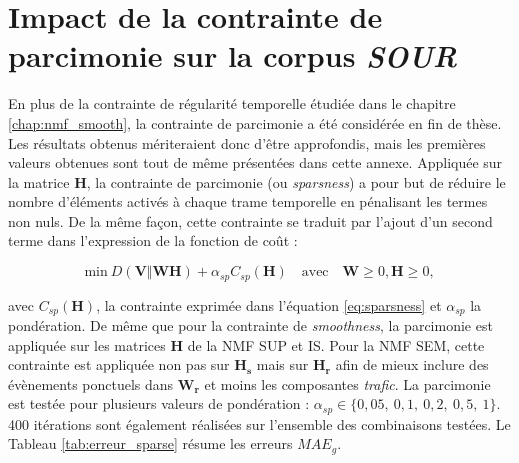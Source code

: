 \chapter{Impact de la contrainte de parcimonie sur la corpus \textit{SOUR}}\label{annexe:parcimonie}

En plus de la contrainte de régularité temporelle étudiée dans le chapitre \ref{chap:nmf_smooth}, la contrainte de parcimonie a été considérée en fin de thèse. Les résultats obtenus mériteraient donc d'être approfondis, mais les premières valeurs obtenues sont tout de même présentées dans cette annexe. Appliquée sur la matrice $\mathbf{H}$, la contrainte de parcimonie (ou \textit{sparsness}) a pour but de réduire le nombre d'éléments activés à chaque trame temporelle en pénalisant les termes non nuls. De la même façon, cette contrainte se traduit par l'ajout d'un second terme dans l'expression de la fonction de coût : 

\begin{equation}
\text{min}~D\left(\textbf{V} \Vert \textbf{WH}\right) + \alpha_{sp} C_{sp}(\mathbf{H}) \quad \text{avec} \quad \mathbf{W} \geq 0, \mathbf{H} \geq 0,
\end{equation}

avec $C_{sp}(\mathbf{H})$, la contrainte exprimée dans l'équation \ref{eq:sparsness} et $\alpha_{sp}$ la pondération. De même que pour la contrainte de \textit{smoothness}, la parcimonie est appliquée sur les matrices $\mathbf{H}$ de la NMF SUP et IS. Pour la NMF SEM, cette contrainte est appliquée non pas sur $\mathbf{H_s}$ mais sur $\mathbf{H_r}$ afin de mieux inclure des évènements ponctuels dans $\mathbf{W_r}$ et moins les composantes \textit{trafic}. La parcimonie est testée pour plusieurs valeurs de pondération : $\alpha_{sp} \in \lbrace0,05,~ 0,1,~ 0,2,~ 0,5,~ 1\rbrace$. 400 itérations sont également réalisées sur l'ensemble des combinaisons testées. Le Tableau \ref{tab:erreur_sparse} résume les erreurs $MAE_g$.

